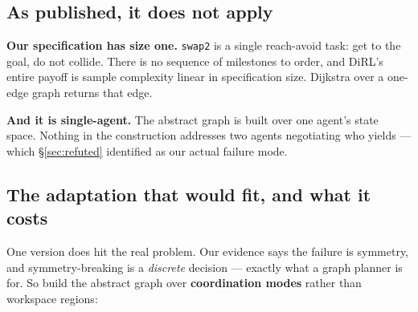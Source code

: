 \documentclass[11pt,a4paper]{article}
\newcommand{\code}[1]{\texttt{\small #1}}
\begin{document}
\subsection{As published, it does not apply}

\textbf{Our specification has size one.} \code{swap2} is a single reach-avoid task: get to
the goal, do not collide. There is no sequence of milestones to order, and DiRL's entire
payoff is sample complexity linear in specification size. Dijkstra over a one-edge graph
returns that edge.

\textbf{And it is single-agent.} The abstract graph is built over one agent's state space.
Nothing in the construction addresses two agents negotiating who yields --- which
\S\ref{sec:refuted} identified as our actual failure mode.

\subsection{The adaptation that would fit, and what it costs}

One version does hit the real problem. Our evidence says the failure is symmetry, and
symmetry-breaking is a \emph{discrete} decision --- exactly what a graph planner is for. So
build the abstract graph over \textbf{coordination modes} rather than workspace regions:

\begin{center}
\end{center}
\end{document}

